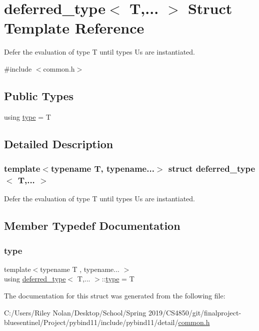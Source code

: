 \hypertarget{structdeferred__type}{}\section{deferred\+\_\+type$<$ T,... $>$ Struct Template Reference}
\label{structdeferred__type}


Defer the evaluation of type T until types Us are instantiated.  




{\ttfamily \#include $<$common.\+h$>$}

\subsection*{Public Types}
\begin{DoxyCompactItemize}
\item 
using \mbox{\hyperlink{structdeferred__type_a1a0932117634b35e4d08eeeb00a6a190}{type}} = T
\end{DoxyCompactItemize}


\subsection{Detailed Description}
\subsubsection*{template$<$typename T, typename...$>$\newline
struct deferred\+\_\+type$<$ T,... $>$}

Defer the evaluation of type T until types Us are instantiated. 

\subsection{Member Typedef Documentation}
\mbox{\label{structdeferred__type_a1a0932117634b35e4d08eeeb00a6a190}} 
\subsubsection{\texorpdfstring{type}{type}}
{\footnotesize\ttfamily template$<$typename T , typename... $>$ \\
using \mbox{\hyperlink{structdeferred__type}{deferred\+\_\+type}}$<$ T,... $>$\+::\mbox{\hyperlink{structdeferred__type_a1a0932117634b35e4d08eeeb00a6a190}{type}} =  T}



The documentation for this struct was generated from the following file\+:\begin{DoxyCompactItemize}
\item 
C\+:/\+Users/\+Riley Nolan/\+Desktop/\+School/\+Spring 2019/\+C\+S4850/git/finalproject-\/bluesentinel/\+Project/pybind11/include/pybind11/detail/\mbox{\hyperlink{detail_2common_8h}{common.\+h}}\end{DoxyCompactItemize}
